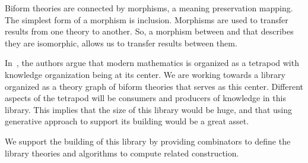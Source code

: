 Biform theories are connected by morphisms, a meaning preservation mapping. The simplest form of a morphism is inclusion. Morphisms are used to transfer results from one theory to another. So, a morphism between  and  that describes they are isomorphic, allows us to transfer results between them. 

In~\cite{carette2020bigMath}, the authors argue that modern mathematics is organized as a tetrapod with knowledge organization being at its center. We are working towards a library organized as a theory graph of biform theories that serves as this center. Different aspects of the tetrapod will be consumers and producers of knowledge in this library. This implies that the size of this library would be huge, and that using generative approach to support its building would be a great asset. 

We support the building of this library by providing combinators to define the library theories and algorithms to compute related construction.






